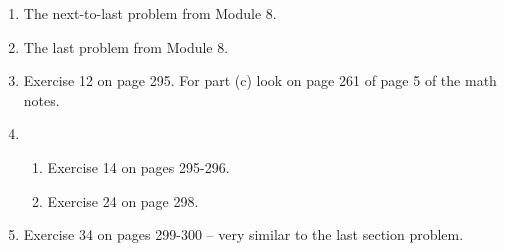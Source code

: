 \documentclass[12pt]{article}
\begin{document}
\begin{enumerate}

\item The next-to-last problem from Module 8.

\item The last problem from Module 8.


\item Exercise 12 on page 295. For part (c) look on page 261 of page 5 of the math notes.

\item \begin{enumerate}

\item Exercise 14 on pages 295-296.
\item Exercise 24 on page 298.

\end{enumerate}

\item Exercise 34 on pages 299-300 -- very similar to the last section problem.
\end{enumerate}









\pagebreak
\end{document}

